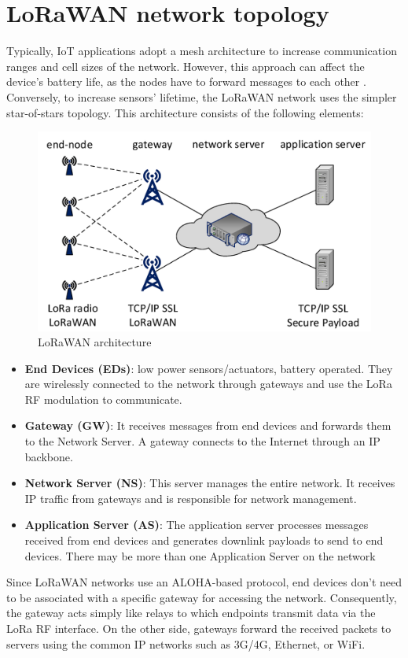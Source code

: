 \section{LoRaWAN network topology}
\label{topology}
Typically, IoT applications adopt a mesh architecture to increase communication ranges and cell sizes of the network. However, this approach can affect the device's battery life, as the nodes have to forward messages to each other \cite{article}. Conversely, to increase sensors' lifetime, the LoRaWAN network uses the simpler star-of-stars topology.  This architecture consists of the following elements:
\begin{figure}
    \centering
    \includegraphics[width=0.7\linewidth]{images/lorawan/architecture.png}
    \caption{LoRaWAN architecture}
    \label{fig:architecture}
\end{figure}
\begin{itemize}
	\item \textbf{End Devices (EDs)}: low power sensors/actuators, battery operated. They are wirelessly connected to the network through gateways and use the LoRa RF modulation to communicate.
	\item \textbf{Gateway (GW)}: It receives messages from end devices and forwards them to the Network Server. A gateway connects to the Internet through an IP backbone.
	\item \textbf{Network Server (NS)}: This server manages the entire network. It receives IP traffic from gateways and is responsible for network management.
	\item \textbf{Application Server (AS)}: The application server processes messages received from end devices and generates downlink payloads to send to end devices. There may be more than one Application Server on the network
\end{itemize}
Since LoRaWAN networks use an ALOHA-based protocol, end devices don't need to be associated with a specific gateway for accessing the network. Consequently, the gateway acts simply like relays to which endpoints transmit data via the LoRa RF interface. On the other side, gateways forward the received packets to servers using the common IP networks such as 3G/4G, Ethernet, or WiFi.

